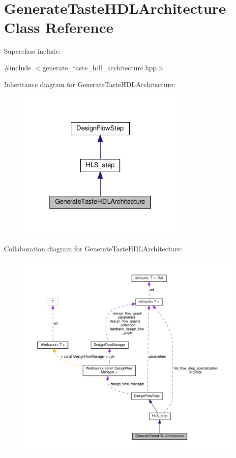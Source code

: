 \hypertarget{classGenerateTasteHDLArchitecture}{}\section{Generate\+Taste\+H\+D\+L\+Architecture Class Reference}
\label{classGenerateTasteHDLArchitecture}


Superclass include.  




{\ttfamily \#include $<$generate\+\_\+taste\+\_\+hdl\+\_\+architecture.\+hpp$>$}



Inheritance diagram for Generate\+Taste\+H\+D\+L\+Architecture\+:
\nopagebreak
\begin{figure}[H]
\begin{center}
\leavevmode
\includegraphics[width=234pt]{d5/d66/classGenerateTasteHDLArchitecture__inherit__graph}
\end{center}
\end{figure}


Collaboration diagram for Generate\+Taste\+H\+D\+L\+Architecture\+:
\nopagebreak
\begin{figure}[H]
\begin{center}
\leavevmode
\includegraphics[width=350pt]{dd/d77/classGenerateTasteHDLArchitecture__coll__graph}
\end{center}
\end{figure}
